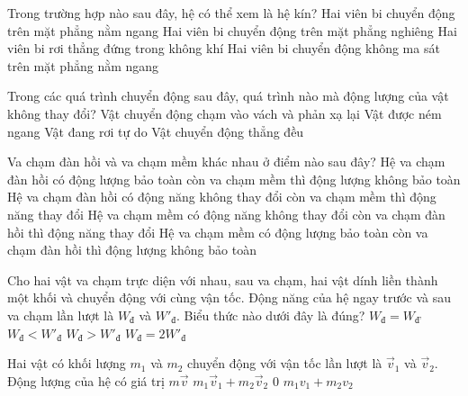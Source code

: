 \begin{ex}
Trong trường hợp nào sau đây, hệ có thể xem là hệ kín?	
	\choice
	{Hai viên bi chuyển động trên mặt phẳng nằm ngang}
	{Hai viên bi chuyển động trên mặt phẳng nghiêng}
	{Hai viên bi rơi thẳng đứng trong không khí}
	{\True Hai viên bi chuyển động không ma sát trên mặt phẳng nằm ngang}
	\loigiai{}
\end{ex}
\begin{ex}
	Trong các quá trình chuyển động sau đây, quá trình nào mà động lượng của vật không thay đổi?
	\choice
	{Vật chuyển động chạm vào vách và phản xạ lại}
	{Vật được ném ngang}
	{Vật đang rơi tự do}
	{\True Vật chuyển động thẳng đều}
	\loigiai{}
\end{ex}
\begin{ex}
Va chạm đàn hồi và va chạm mềm khác nhau ở điểm nào sau đây?	
	\choice
	{Hệ va chạm đàn hồi có động lượng bảo toàn còn va chạm mềm thì động lượng không bảo toàn}
	{\True Hệ va chạm đàn hồi có động năng không thay đổi còn va chạm mềm thì động năng thay đổi}
	{Hệ va chạm mềm có động năng không thay đổi còn va chạm đàn hồi thì động năng thay đổi}
	{Hệ va chạm mềm có động lượng bảo toàn còn va chạm đàn hồi thì động lượng không bảo toàn}
	\loigiai{}
\end{ex}
\begin{ex}
	Cho hai vật va chạm trực diện với nhau, sau va chạm, hai vật dính liền thành một khối và chuyển động với cùng vận tốc. Động năng của hệ ngay trước và sau va chạm lần lượt là $W_\text{đ}$ và $W'_\text{đ}$. Biểu thức nào dưới đây là đúng?
	\choice
	{$W_\text{đ}=W_\text{đ'}$}
	{$W_\text{đ}<W'_\text{đ}$}
	{\True $W_\text{đ}>W'_\text{đ}$}
	{$W_\text{đ}=2W'_\text{đ}$}
\end{ex}
\begin{ex}
	Hai vật có khối lượng $m_1$ và $m_2$ chuyển động với vận tốc lần lượt là $\vec v_1$ và $\vec v_2$. Động lượng của hệ có giá trị 
	\choice
	{$m\vec v$}
	{\True $m_1\vec v_1+m_2\vec v_2$}
	{0}
	{$m_1v_1+m_2v_2$}
	\loigiai{}
\end{ex}
